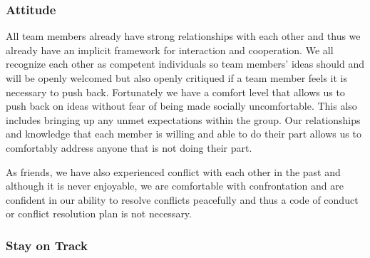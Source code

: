 \documentclass{article}
\begin{document}
\subsubsection*{Attitude}


\par{All team members already have strong relationships with each other and thus we already have an implicit framework for interaction and cooperation.
We all recognize each other as competent individuals so team members' ideas should and will be openly welcomed but also openly critiqued if a team
member feels it is necessary to push back. Fortunately we have a comfort level that allows us to push back on ideas without fear of being made socially
uncomfortable. This also includes bringing up any unmet expectations within the group. Our relationships and knowledge that each member is willing
and able to do their part allows us to comfortably address anyone that is not doing their part. \newline\newline\indent

As friends, we have also experienced conflict with each other in the past and although it is never enjoyable, we are comfortable with confrontation
and are confident in our ability to resolve conflicts peacefully and thus a code of conduct or conflict resolution plan is not necessary.}

\subsubsection*{Stay on Track}



\end{document}
